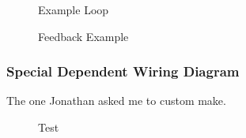 \begin{figure}[h]
	\centering
	\caption{Example Loop}
	\label{fig:exampleloop}
\end{figure}

\begin{figure}[h]
\centering
\begin{subfigure}{0.5\textwidth}
    \centering
    \vspace{-.3in}
    \subcaption{}
\end{subfigure}\hfill
\begin{subfigure}{0.5\textwidth}
    \centering
     \vspace{-.3in}
     \subcaption{}
     \end{subfigure}    
    \caption{} 

\label{fig:fullfig}
\end{figure}


\begin{figure}[h]
	\centering
	\caption{Feedback Example}
	\label{fig:feedback-example}
\end{figure}

\subsubsection{Special Dependent Wiring Diagram}
The one Jonathan asked me to custom make.
\begin{figure}[h]
	\centering
	\caption{Test}
	\label{fig:dependent-WD}
\end{figure}



